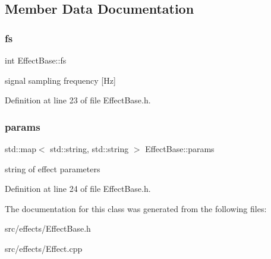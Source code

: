 \subsection{Member Data Documentation}
\mbox{\label{class_effect_base_a18021994da076630edfe26d69fd1384f}} 
\subsubsection{\texorpdfstring{fs}{fs}}
{\footnotesize\ttfamily int Effect\+Base\+::fs\hspace{0.3cm}{\ttfamily [static]}}

signal sampling frequency \mbox{[}Hz\mbox{]} 

Definition at line 23 of file Effect\+Base.\+h.

\mbox{\label{class_effect_base_a593c207eb855ae1bc37069766da29c9a}} 
\subsubsection{\texorpdfstring{params}{params}}
{\footnotesize\ttfamily std\+::map$<$ std\+::string, std\+::string $>$ Effect\+Base\+::params\hspace{0.3cm}{\ttfamily [static]}}

string of effect parameters 

Definition at line 24 of file Effect\+Base.\+h.



The documentation for this class was generated from the following files\+:\begin{DoxyCompactItemize}
\item 
src/effects/Effect\+Base.\+h\item 
src/effects/Effect.\+cpp\end{DoxyCompactItemize}
